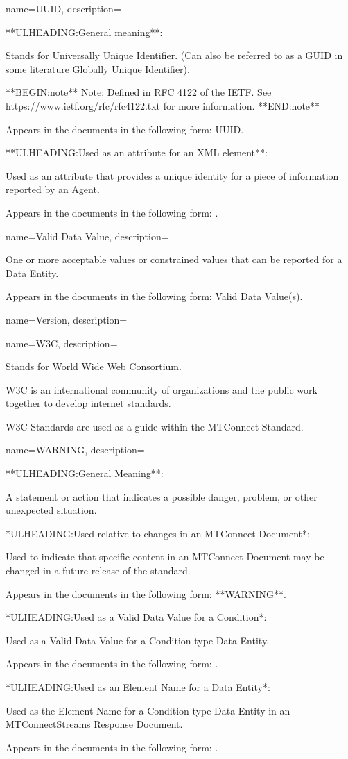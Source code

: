 {
    name={UUID},
	description={
	**ULHEADING:General meaning**:

	Stands for Universally Unique Identifier. (Can also be referred to as a GUID in some literature  Globally Unique Identifier).

	**BEGIN:note**
	Note:  Defined in RFC 4122 of the IETF.  See https://www.ietf.org/rfc/rfc4122.txt for more information.
	**END:note**

	Appears in the documents in the following form: UUID.

	**ULHEADING:Used as an attribute for an XML element**:

	Used as an attribute that provides a unique identity for a piece of information reported by an \gls{Agent}.

	Appears in the documents in the following form: .
}
}

{
    name={Valid Data Value},
	description={
	One or more acceptable values or constrained values that can be reported for a \gls{Data Entity}.

	Appears in the documents in the following form: \gls{Valid Data Value}(s).
}
}

{
    name={Version},
	description={}
}

{
    name={W3C},
	description={
	Stands for World Wide Web Consortium.

	W3C is an international community of organizations and the public work together to develop internet standards.  

	W3C Standards are used as a guide within the MTConnect Standard.
}
}

{
    name={WARNING},
	description={
	**ULHEADING:General Meaning**:

	A statement or action that indicates a possible danger, problem, or other unexpected situation.

	*ULHEADING:Used relative to changes in an \gls{MTConnect Document}*:

	Used to indicate that specific content in an \gls{MTConnect Document} may be changed in a future release of the standard.

	Appears in the documents in the following form: **WARNING**.

	*ULHEADING:Used as a \gls{Valid Data Value} for a \gls{Condition}*:

	Used as a \gls{Valid Data Value} for a \gls{Condition} type \gls{Data Entity}.

	Appears in the documents in the following form: .

	*ULHEADING:Used as an \gls{Element Name} for a \gls{Data Entity}*:

	Used as the \gls{Element Name} for a \gls{Condition} type \gls{Data Entity} in an \gls{MTConnectStreams Response Document}.

	Appears in the documents in the following form: .
}
}

